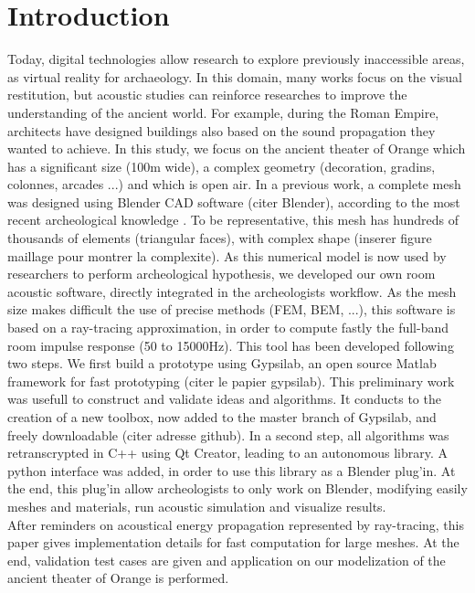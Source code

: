 \documentclass[AMA,STIX1COL]{WileyNJD-v2}
\begin{document}
\section{Introduction}\label{sec1}
Today, digital technologies allow research to explore previously inaccessible areas, as virtual reality for archaeology. In this domain, many works focus on the visual restitution, but acoustic studies can reinforce researches to improve the understanding of the ancient world. For example, during the Roman Empire, architects have designed buildings also based on the sound propagation they wanted to achieve\cite{vitruve}. In this study, we focus on the ancient theater of Orange which has a significant size (100m wide), a complex geometry (decoration, gradins, colonnes, arcades ...) and which is open air. In a previous work, a complete mesh was designed using Blender CAD software (citer Blender), according to the most recent archeological knowledge \cite{theseRobin}. To be representative, this mesh has hundreds of thousands of elements (triangular faces), with complex shape (inserer figure maillage pour montrer la complexite). As this numerical model is now used by researchers to perform archeological hypothesis, we developed our own room acoustic software, directly integrated in the archeologists workflow. As the mesh size makes difficult the use of precise methods (FEM, BEM, ...), this software is based on a ray-tracing approximation, in order to compute fastly the full-band room impulse response (50 to 15000Hz). This tool has been developed following two steps. We first build a prototype using Gypsilab, an open source Matlab framework for fast prototyping (citer le papier gypsilab). This preliminary work was usefull to construct and validate ideas and algorithms. It conducts to the creation of a new toolbox, now added to the master branch of Gypsilab, and freely downloadable (citer adresse github). In a second step, all algorithms was retranscrypted in C++ using Qt Creator, leading to an autonomous library. A python interface was added, in order to use this library as a Blender plug'in. At the end, this plug'in allow archeologists to only work on Blender, modifying easily meshes and materials, run acoustic simulation and visualize results. \\
After reminders on acoustical energy propagation represented by ray-tracing, this paper gives implementation details for fast computation for large meshes. At the end, validation test cases are given and application on our modelization of the ancient theater of Orange is performed. 
\end{document}
